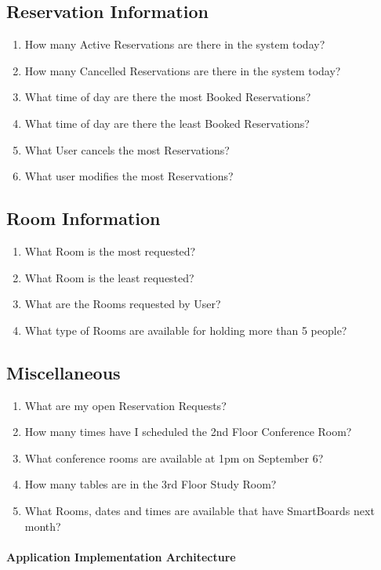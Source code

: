 \documentclass[11pt]{report}
\begin{document}
\subsection*{Reservation Information}
\begin{enumerate}
\item How many Active Reservations are there in the system today?
\item How many Cancelled Reservations are there in the system today?
\item What time of day are there the most Booked Reservations?
\item What time of day are there the least Booked Reservations?
\item What User cancels the most Reservations?
\item What user modifies the most Reservations?
\end{enumerate}

\subsection*{Room Information}
\begin{enumerate}
\item What Room is the most requested?
\item What Room is the least requested?
\item What are the Rooms requested by User?
\item What type of Rooms are available for holding more than 5 people?
\end{enumerate}

\subsection*{Miscellaneous}
\begin{enumerate}
\item What are my open Reservation Requests?
\item How many times have I scheduled the 2nd Floor Conference Room?
\item What conference rooms are available at 1pm on September 6?
\item How many tables are in the 3rd Floor Study Room?
\item What Rooms, dates and times are available that have SmartBoards next month?
\end{enumerate}

\paragraph{Application Implementation Architecture}
\end{document}
